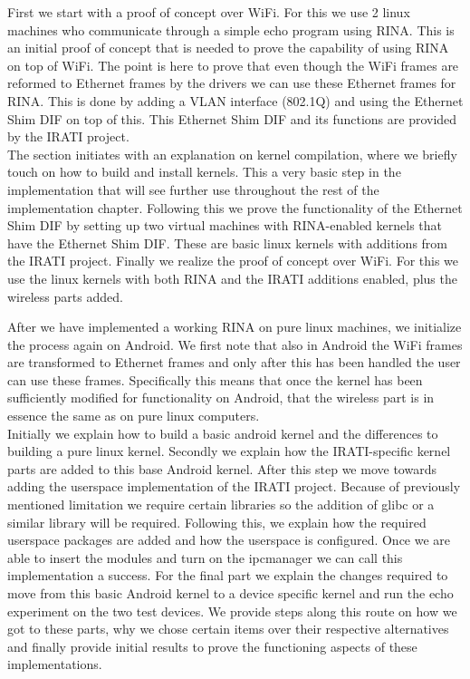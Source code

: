 First we start with a proof of concept over WiFi. For this we use 2 linux machines who communicate through a simple echo program using RINA. This is an initial proof of concept that is needed to prove the capability of using RINA on top of WiFi. The point is here to prove that even though the WiFi frames are reformed to Ethernet frames by the drivers we can use these Ethernet frames for RINA. This is done by adding a VLAN interface (802.1Q) and using the Ethernet Shim DIF on top of this. This Ethernet Shim DIF and its functions are provided by the IRATI project. 
\\
The section initiates with an explanation on kernel compilation, where we briefly touch on how to build and install kernels. This a very basic step in the implementation that will see further use throughout the rest of the implementation chapter. Following this we prove the functionality of the Ethernet Shim DIF by setting up two virtual machines with RINA-enabled kernels that have the Ethernet Shim DIF. These are basic linux kernels with additions from the IRATI project. Finally we realize the proof of concept over WiFi. For this we use the linux kernels with both RINA and the IRATI additions enabled, plus the wireless parts added. 


\npar
After we have implemented a working RINA on pure linux machines, we initialize the process again on Android. We first note that also in Android the WiFi frames are transformed to Ethernet frames and only after this has been handled the user can use these frames. Specifically this means that once the kernel has been sufficiently modified for functionality on Android, that the wireless part is in essence the same as on pure linux computers. 
\\
Initially we explain how to build a basic android kernel and the differences to building a pure linux kernel. Secondly we explain how the IRATI-specific kernel parts are added to this base Android kernel. After this step we move towards adding the userspace implementation of the IRATI project. Because of previously mentioned limitation we require certain libraries so the addition of  glibc or a similar library will be required. Following this, we explain how the required userspace packages are added and how the userspace is configured. Once we are able to insert the modules and turn on the ipcmanager we can call this implementation a success. For the final part we explain the changes required to move from this basic Android kernel to a device specific kernel and run the echo experiment on the two test devices. 
\npar
We provide steps along this route on how we got to these parts, why we chose certain items over their respective alternatives and finally provide initial results to prove the functioning aspects of these implementations. 


